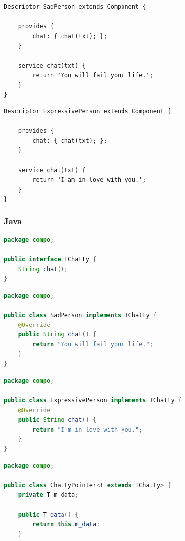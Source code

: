 \documentclass[11pt,a4paper,openany,oneside]{book}
\begin{document}
\begin{appendices}
\begin{lstlisting}[language=Compo, frame=single, caption=SadPerson]
Descriptor SadPerson extends Component {

    provides {
        chat: { chat(txt); };
    }
    
    service chat(txt) {
        return 'You will fail your life.';
    }
}
\end{lstlisting}

\begin{lstlisting}[language=Compo, frame=single, caption=ExpressivePerson]
Descriptor ExpressivePerson extends Component {

    provides {
        chat: { chat(txt); };
    }
    
    service chat(txt) {
        return 'I am in love with you.';
    }
}
\end{lstlisting}


\clearpage

\subsubsection{Java}

\begin{lstlisting}[language=Java, frame=single, caption=IChatty]
package compo;

public interface IChatty {
    String chat();
}
\end{lstlisting}

\begin{lstlisting}[language=Java, frame=single, caption=SadPerson]
package compo;

public class SadPerson implements IChatty {
    @Override
    public String chat() {
        return "You will fail your life.";
    }
}
\end{lstlisting}

\begin{lstlisting}[language=Java, frame=single, caption=ExpressivePerson]
package compo;

public class ExpressivePerson implements IChatty {
    @Override
    public String chat() {
        return "I'm in love with you.";
    }
}
\end{lstlisting}

\begin{lstlisting}[language=Java, frame=single, caption=ChattyPointer]
package compo;

public class ChattyPointer<T extends IChatty> {
    private T m_data;

    public T data() {
        return this.m_data;
    }


\end{lstlisting}
\end{appendices}
\end{document}
